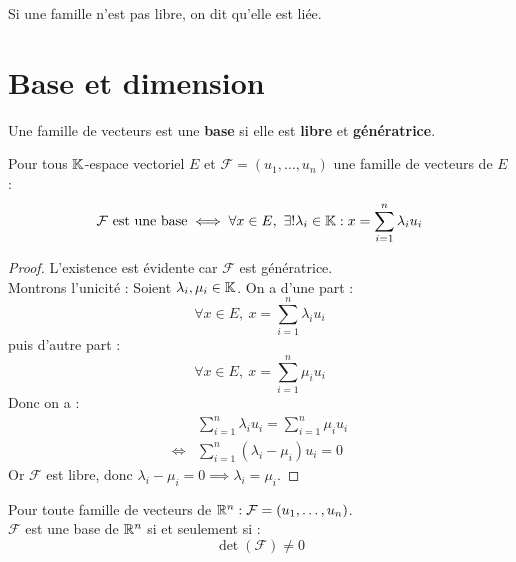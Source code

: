 \begin{remark}
	Si une famille n'est pas libre, on dit qu'elle est liée.
\end{remark}

\section{Base et dimension}
\begin{definition}[Base]
	Une famille de vecteurs est une \textbf{base} si elle est \textbf{libre} et \textbf{génératrice}.
\end{definition}

\begin{proposition}
	Pour tous $\mathbb{K}$-espace vectoriel $E$ et $\mathcal{F} = (u_1, \ldots, u_n)$ une famille de vecteurs de $E$ :
	\[ 
	\mathcal{F} \text{ est une base} \iff 
	\forall x \in E,\ \exists ! \lambda_i \in \mathbb{K} : x = \sum_{i = 1}^n \lambda_i u_i
	\]
\end{proposition}

\begin{proof}
	L'existence est évidente car $\mathcal{F}$ est génératrice. 
	\\
	Montrons l'unicité : Soient $\lambda_i, \mu_i \in \mathbb{K}$.
	On a d'une part :
	\[ \forall x \in E,\ x = \sum_{i=1}^{n} \lambda_i u_i \]
	puis d'autre part :
	\[ \forall x \in E,\ x = \sum_{i=1}^{n} \mu_i u_i \]
	Donc on a :
	\begin{align*}
		&\sum_{i=1}^{n} \lambda_i u_i = \sum_{i=1}^{n} \mu_i u_i \\
		\iff &\sum_{i=1}^{n} (\lambda_i - \mu_i) u_i = 0 
	\end{align*}
	Or $\mathcal{F}$ est libre, donc $\lambda_i - \mu_i = 0 \implies \lambda_i = \mu_i$.
\end{proof}

\begin{proposition}
	Pour toute famille de vecteurs de $\mathbb{R}^n : \mathcal{F} = (u_1, \ldots, u_n)$. 
	\\
	$\mathcal{F}$ est une base de $\mathbb{R}^n$ si et seulement si :
	\[ \det(\mathcal{F}) \neq 0 \]
\end{proposition}


